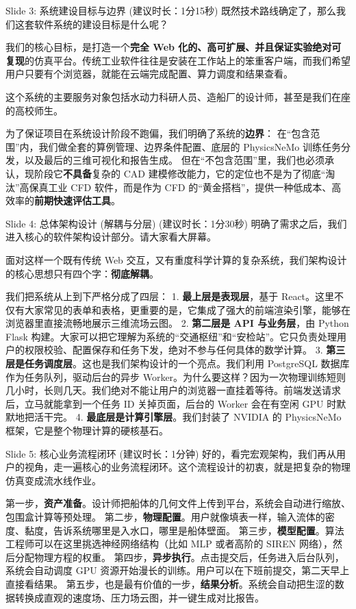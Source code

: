 \documentclass[UTF8,11pt]{ctexart}
\begin{document}
\begin{slidebox}{Slide 3: 系统建设目标与边界 (建议时长：1分15秒)}
既然技术路线确定了，那么我们这套软件系统的建设目标是什么呢？

我们的核心目标，是打造一个\textbf{完全 Web 化的、高可扩展、并且保证实验绝对可复现}的仿真平台。传统工业软件往往是安装在工作站上的笨重客户端，而我们希望用户只要有个浏览器，就能在云端完成配置、算力调度和结果查看。

这个系统的主要服务对象包括水动力科研人员、造船厂的设计师，甚至是我们在座的高校师生。

为了保证项目在系统设计阶段不跑偏，我们明确了系统的\textbf{边界}：
在“包含范围”内，我们做全套的算例管理、边界条件配置、底层的 PhysicsNeMo 训练任务分发，以及最后的三维可视化和报告生成。
但在“不包含范围”里，我们也必须承认，现阶段它\textbf{不具备}复杂的 CAD 建模修改能力，它的定位也不是为了彻底“淘汰”高保真工业 CFD 软件，而是作为 CFD 的“黄金搭档”，提供一种低成本、高效率的\textbf{前期快速评估工具}。
\end{slidebox}

\begin{slidebox}{Slide 4: 总体架构设计 (解耦与分层) (建议时长：1分30秒)}
明确了需求之后，我们进入核心的软件架构设计部分。请大家看大屏幕。

面对这样一个既有传统 Web 交互，又有重度科学计算的复杂系统，我们架构设计的核心思想只有四个字：\textbf{彻底解耦}。

我们把系统从上到下严格分成了四层：
1. \textbf{最上层是表现层}，基于 React。这里不仅有大家常见的表单和表格，更重要的是，它集成了强大的前端渲染引擎，能够在浏览器里直接流畅地展示三维流场云图。
2. \textbf{第二层是 API 与业务层}，由 Python Flask 构建。大家可以把它理解为系统的“交通枢纽”和“安检站”。它只负责处理用户的权限校验、配置保存和任务下发，绝对不参与任何具体的数学计算。
3. \textbf{第三层是任务调度层}。这也是我们架构设计的一个亮点。我们利用 PostgreSQL 数据库作为任务队列，驱动后台的异步 Worker。为什么要这样？因为一次物理训练短则几小时，长则几天。我们绝对不能让用户的浏览器一直挂着等待。前端发送请求后，立马就能拿到一个任务 ID 关掉页面，后台的 Worker 会在有空闲 GPU 时默默地把活干完。
4. \textbf{最底层是计算引擎层}。我们封装了 NVIDIA 的 PhysicsNeMo 框架，它是整个物理计算的硬核基石。
\end{slidebox}

\begin{slidebox}{Slide 5: 核心业务流程闭环 (建议时长：1分钟)}
好的，看完宏观架构，我们再从用户的视角，走一遍核心的业务流程闭环。这个流程设计的初衷，就是把复杂的物理仿真变成流水线作业。

第一步，\textbf{资产准备}。设计师把船体的几何文件上传到平台，系统会自动进行缩放、包围盒计算等预处理。
第二步，\textbf{物理配置}。用户就像填表一样，输入流体的密度、黏度，告诉系统哪里是入水口，哪里是船体壁面。
第三步，\textbf{模型配置}。算法工程师可以在这里挑选神经网络结构（比如 MLP 或者高阶的 SIREN 网络），然后分配物理方程的权重。
第四步，\textbf{异步执行}。点击提交后，任务进入后台队列，系统会自动调度 GPU 资源开始漫长的训练。用户可以在下班前提交，第二天早上直接看结果。
第五步，也是最有价值的一步，\textbf{结果分析}。系统会自动把生涩的数据转换成直观的速度场、压力场云图，并一键生成对比报告。
\end{slidebox}
\end{document}
